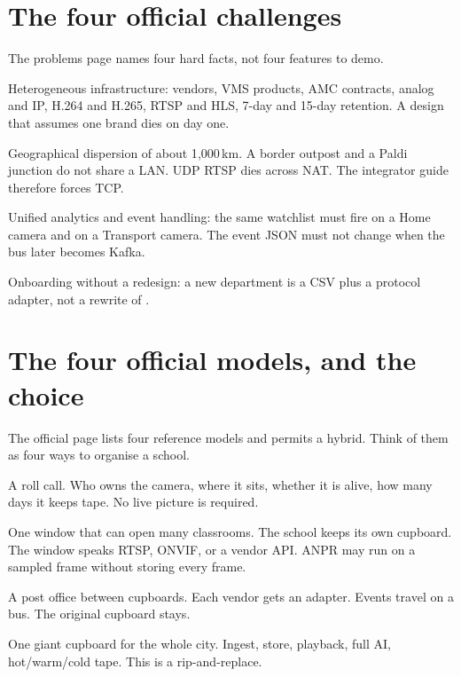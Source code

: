 \documentclass[listings]{csf301-notes}
\begin{document}
\section{The four official challenges}
The problems page names four hard facts, not four features to demo.

Heterogeneous infrastructure: vendors, VMS products, AMC contracts, analog and IP, H.264 and H.265, RTSP and HLS, 7-day and 15-day retention. A design that assumes one brand dies on day one.

Geographical dispersion of about 1{,}000\,km. A border outpost and a Paldi junction do not share a LAN. UDP RTSP dies across NAT. The integrator guide therefore forces TCP.

Unified analytics and event handling: the same watchlist must fire on a Home camera and on a Transport camera. The event JSON must not change when the bus later becomes Kafka.

Onboarding without a redesign: a new department is a CSV plus a protocol adapter, not a rewrite of .

\section{The four official models, and the choice}
The official page lists four reference models and permits a hybrid. Think of them as four ways to organise a school.

\begin{definition}
A roll call. Who owns the camera, where it sits, whether it is alive, how many days it keeps tape. No live picture is required.
\end{definition}

\begin{definition}
One window that can open many classrooms. The school keeps its own cupboard. The window speaks RTSP, ONVIF, or a vendor API. ANPR may run on a sampled frame without storing every frame.
\end{definition}

\begin{definition}
A post office between cupboards. Each vendor gets an adapter. Events travel on a bus. The original cupboard stays.
\end{definition}

\begin{definition}
One giant cupboard for the whole city. Ingest, store, playback, full AI, hot/warm/cold tape. This is a rip-and-replace.
\end{definition}
\end{document}
